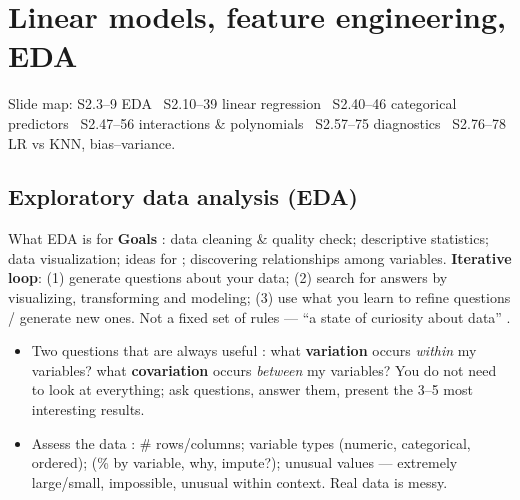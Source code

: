 \section{Linear models, feature engineering, EDA}
{\footnotesize Slide map: S2.3--9 EDA \textbullet\ S2.10--39 linear regression \textbullet\ S2.40--46 categorical predictors \textbullet\ S2.47--56 interactions \& polynomials \textbullet\ S2.57--75 diagnostics \textbullet\ S2.76--78 LR vs KNN, bias--variance.}

\subsection{Exploratory data analysis (EDA)}
\begin{topic}{What EDA is for}
\textbf{Goals} : data cleaning \& quality check; descriptive statistics; data visualization; ideas for ; discovering relationships among variables.
\textbf{Iterative loop}: (1) generate questions about your data; (2) search for answers by visualizing, transforming and modeling; (3) use what you learn to refine questions / generate new ones. Not a fixed set of rules --- ``a state of curiosity about data'' .
\begin{itemize}
\item Two questions that are always useful : what \textbf{variation} occurs \emph{within} my variables? what \textbf{covariation} occurs \emph{between} my variables? You do not need to look at everything; ask questions, answer them, present the 3--5 most interesting results.
\item Assess the data : \# rows/columns; variable types (numeric, categorical, ordered);  (\% by variable, why, impute?); unusual values --- extremely large/small, impossible, unusual within context. Real data is messy.
\end{itemize}
\end{topic}

